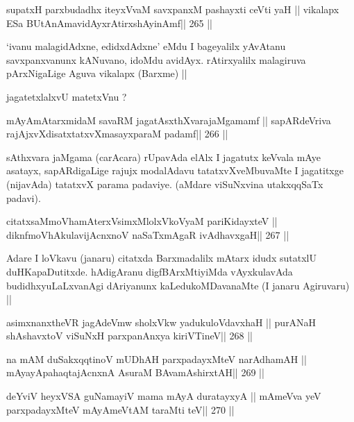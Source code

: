 \begin{shl}
supatxH parxbudadhx iteyxVvaM savxpanxM pashayxti ceVti yaH ||
vikalapx ESa BUtAnAmavidAyxrAtirxshAyinAmf\hfill || 265 ||
\end{shl}

\begin{artha}
`ivanu malagidAdxne, edidxdAdxne' eMdu I bageyalilx yAvAtanu 
savxpanxvanunx kANuvano, idoMdu avidAyx. rAtirxyalilx malagiruva pArxNigaLige Aguva vikalapx (Barxme) ||
\end{artha}

\begin{artha}
jagatetxlalxvU matetxVnu ?
\end{artha}

\begin{shl}
mAyAmAtarxmidaM savaRM jagatAsxthXvarajaMgamamf ||
sapARdeVriva rajAjxvXdisatxtatxvXmasayxparaM padamf\hfill || 266 ||
\end{shl}

\begin{artha}
sAthxvara jaMgama (carAcara) rUpavAda elAlx I jagatutx keVvala mAye 
asatayx, sapARdigaLige rajujx modalAdavu tatatxvXveMbuvaMte I 
jagatitxge (nijavAda) tatatxvX parama padaviye. (aMdare viSuNxvina utakxqqSaTx padavi).
\end{artha}

\begin{shl}
citatxsaMmoVhamAterxVsimxMlolxVkoV\s yaM pariKidayxteV ||
diknfmoVhAkulavijAcnxnoV naSaTxmAgaR ivAdhavxgaH\hfill || 267 ||
\end{shl}

\begin{artha}
Adare I loVkavu (janaru) citatxda Barxmadalilx mAtarx idudx sutatxlU 
duHKapaDutitxde. hAdigAranu digfBArxMtiyiMda vAyxkulavAda budidhxyuLaLxvanAgi dAriyanunx kaLedukoMDavanaMte (I janaru Agiruvaru) ||
\end{artha}

\begin{shl}
asimxnanxtheVR jagAdeVmw sholxVkw yadukuloVdavxhaH ||
purANaH shAshavxtoV viSuNxH parxpanAnxya kiriVTineV\hfill || 268 ||
\end{shl}

\begin{shl}
na mAM duSakxqqtinoV mUDhAH parxpadayxMteV narAdhamAH ||
mAyayA\s pahaqtajAcnxnA AsuraM BAvamAshirxtAH\hfill || 269 ||
\end{shl}

\begin{shl}
deYviV heyxVSA guNamayiV mama mAyA duratayxyA ||
mAmeVva yeV parxpadayxMteV mAyAmeVtAM taraMti teV\hfill || 270 ||
\end{shl}

